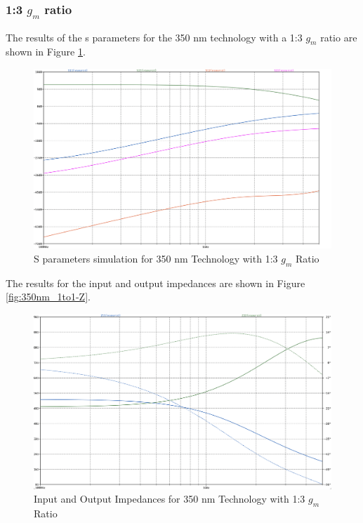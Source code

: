 \subsubsection{1:3 $g_m$ ratio}

The results of the s parameters for the 350 nm technology with a 1:3 $g_m$ ratio are shown in Figure \ref{fig:350nm_1ton}. 
\begin{figure}[H]
    \centering
    \includegraphics[width=1\textwidth]{Images/3501to3SParam.png}
    \caption{S parameters simulation for 350 nm Technology with 1:3 $g_m$ Ratio}
    \label{fig:350nm_1ton}
\end{figure}

The results for the input and output impedances are shown in Figure \ref{fig:350nm_1to1-Z}.

\begin{figure}[H]
    \centering
    \includegraphics[width=1\textwidth]{Images/3501to3ZParam.png}
    \caption{Input and Output Impedances for 350 nm Technology with 1:3 $g_m$ Ratio}
    \label{fig:350nm_1ton-Z}
\end{figure}

